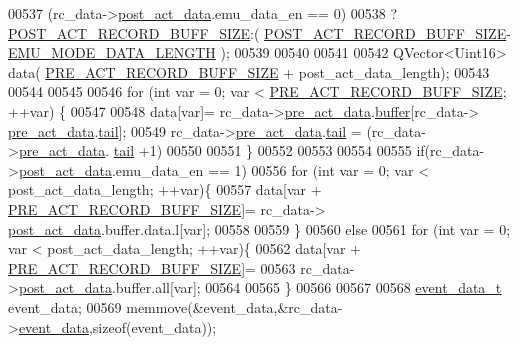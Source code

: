 \begin{DoxyCode}
00537                 (rc\_data->\hyperlink{a00019_a905fb7ebfe7134f1b9f55c92227b5d0c}{post\_act\_data}.emu\_data\_en == 0)
00538                 ?\hyperlink{a00006_ab1ad440de86fff80e517ad748de2ee39}{POST\_ACT\_RECORD\_BUFF\_SIZE}:(
      \hyperlink{a00006_ab1ad440de86fff80e517ad748de2ee39}{POST\_ACT\_RECORD\_BUFF\_SIZE}-\hyperlink{a00006_af4c3a8ad94feb4d7bda7f107f34baf41}{EMU\_MODE\_DATA\_LENGTH} );
00539 
00540 
00541 
00542         QVector<Uint16> data( \hyperlink{a00006_a18dcecc16ded13fa622e0913e73442e6}{PRE\_ACT\_RECORD\_BUFF\_SIZE} + post\_act\_data\_length);
00543 
00544 
00545 
00546         \textcolor{keywordflow}{for} (\textcolor{keywordtype}{int} var = 0; var < \hyperlink{a00006_a18dcecc16ded13fa622e0913e73442e6}{PRE\_ACT\_RECORD\_BUFF\_SIZE}; ++var) \{
00547             
00548             data[var]= rc\_data->\hyperlink{a00019_ac8e7141463960fd1e27eb25547d02555}{pre\_act\_data}.\hyperlink{a00006_a5f6608d29ecab36269ae25b2e7afb1f3}{buffer}[rc\_data->
      \hyperlink{a00019_ac8e7141463960fd1e27eb25547d02555}{pre\_act\_data}.\hyperlink{a00006_a3c4762f0dfae85a9efc17a36c6cb84a6}{tail}];
00549             rc\_data->\hyperlink{a00019_ac8e7141463960fd1e27eb25547d02555}{pre\_act\_data}.\hyperlink{a00006_a3c4762f0dfae85a9efc17a36c6cb84a6}{tail} = (rc\_data->\hyperlink{a00019_ac8e7141463960fd1e27eb25547d02555}{pre\_act\_data}.
      \hyperlink{a00006_a3c4762f0dfae85a9efc17a36c6cb84a6}{tail} +1)%
00550 
00551         \}
00552 
00553 
00554 
00555         \textcolor{keywordflow}{if}(rc\_data->\hyperlink{a00019_a905fb7ebfe7134f1b9f55c92227b5d0c}{post\_act\_data}.emu\_data\_en == 1)
00556             \textcolor{keywordflow}{for} (\textcolor{keywordtype}{int} var = 0; var < post\_act\_data\_length; ++var)\{
00557                 data[var + \hyperlink{a00006_a18dcecc16ded13fa622e0913e73442e6}{PRE\_ACT\_RECORD\_BUFF\_SIZE}]= rc\_data->
      \hyperlink{a00019_a905fb7ebfe7134f1b9f55c92227b5d0c}{post\_act\_data}.buffer.data.l[var];
00558 
00559             \}
00560         \textcolor{keywordflow}{else}
00561             \textcolor{keywordflow}{for} (\textcolor{keywordtype}{int} var = 0; var < post\_act\_data\_length; ++var)\{
00562                 data[var + \hyperlink{a00006_a18dcecc16ded13fa622e0913e73442e6}{PRE\_ACT\_RECORD\_BUFF\_SIZE}]=
00563                 rc\_data->\hyperlink{a00019_a905fb7ebfe7134f1b9f55c92227b5d0c}{post\_act\_data}.buffer.all[var];
00564 
00565             \}
00566 
00567 
00568         \hyperlink{a00006_d6/d7d/a00161}{event\_data\_t} event\_data;
00569         memmove(&event\_data,&rc\_data->\hyperlink{a00019_a5a700ec4c240f4e86c5fb61aef8d983e}{event\_data},\textcolor{keyword}{sizeof}(event\_data));

\end{DoxyCode}
